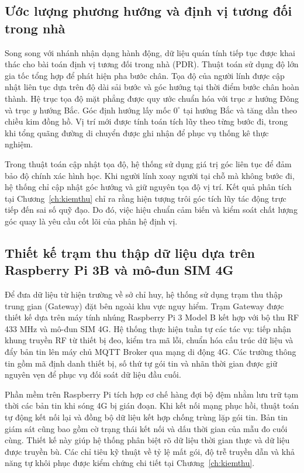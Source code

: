\subsection{Ước lượng phương hướng và định vị tương đối trong nhà}
Song song với nhánh nhận dạng hành động, dữ liệu quán tính tiếp tục được khai thác cho bài toán định vị tương đối trong nhà (PDR). Thuật toán sử dụng độ lớn gia tốc tổng hợp để phát hiện pha bước chân. Tọa độ của người lính được cập nhật liên tục dựa trên độ dài sải bước và góc hướng tại thời điểm bước chân hoàn thành. Hệ trục tọa độ mặt phẳng được quy ước chuẩn hóa với trục $x$ hướng Đông và trục $y$ hướng Bắc. Góc định hướng lấy mốc $0^\circ$ tại hướng Bắc và tăng dần theo chiều kim đồng hồ. Vị trí mới được tính toán tích lũy theo từng bước đi, trong khi tổng quãng đường di chuyển được ghi nhận để phục vụ thống kê thực nghiệm.

Trong thuật toán cập nhật tọa độ, hệ thống sử dụng giá trị góc liên tục để đảm bảo độ chính xác hình học. Khi người lính xoay người tại chỗ mà không bước đi, hệ thống chỉ cập nhật góc hướng và giữ nguyên tọa độ vị trí. Kết quả phân tích tại Chương~\ref{ch:kiemthu} chỉ ra rằng hiện tượng trôi góc tích lũy tác động trực tiếp đến sai số quỹ đạo. Do đó, việc hiệu chuẩn cảm biến và kiểm soát chất lượng góc quay là yêu cầu cốt lõi của phân hệ định vị.

\subsection{Thiết kế trạm thu thập dữ liệu dựa trên Raspberry Pi 3B và mô-đun SIM 4G}
Để đưa dữ liệu từ hiện trường về sở chỉ huy, hệ thống sử dụng trạm thu thập trung gian (Gateway) đặt bên ngoài khu vực nguy hiểm. Trạm Gateway được thiết kế dựa trên máy tính nhúng Raspberry Pi 3 Model B kết hợp với bộ thu RF 433 MHz và mô-đun SIM 4G. Hệ thống thực hiện tuần tự các tác vụ: tiếp nhận khung truyền RF từ thiết bị đeo, kiểm tra mã lỗi, chuẩn hóa cấu trúc dữ liệu và đẩy bản tin lên máy chủ MQTT Broker qua mạng di động 4G. Các trường thông tin gồm mã định danh thiết bị, số thứ tự gói tin và nhãn thời gian được giữ nguyên vẹn để phục vụ đối soát dữ liệu đầu cuối.

Phần mềm trên Raspberry Pi tích hợp cơ chế hàng đợi bộ đệm nhằm lưu trữ tạm thời các bản tin khi sóng 4G bị gián đoạn. Khi kết nối mạng phục hồi, thuật toán tự động kết nối lại và đồng bộ dữ liệu kết hợp chống trùng lặp gói tin. Bản tin giám sát cũng bao gồm cờ trạng thái kết nối và dấu thời gian của mẫu đo cuối cùng. Thiết kế này giúp hệ thống phân biệt rõ dữ liệu thời gian thực và dữ liệu được truyền bù. Các chỉ tiêu kỹ thuật về tỷ lệ mất gói, độ trễ truyền dẫn và khả năng tự khôi phục được kiểm chứng chi tiết tại Chương~\ref{ch:kiemthu}.


